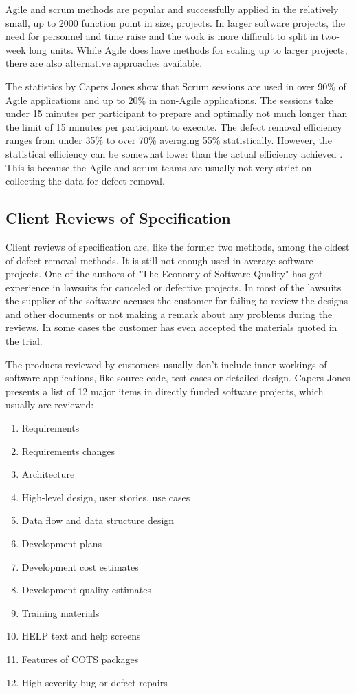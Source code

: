 Agile and scrum methods are popular and successfully applied in the relatively small, up to 2000 function point in size, projects. In larger software projects, the need for personnel and time raise and the work is more difficult to split in two-week long units. While Agile does have methods for scaling up to larger projects, there are also alternative approaches available.

The statistics by Capers Jones show that Scrum sessions are used in over 90\% of Agile applications and up to 20\% in non-Agile applications. The sessions take under 15 minutes per participant to prepare and optimally not much longer than the limit of 15 minutes per participant to execute. The defect removal efficiency ranges from under 35\% to over 70\% averaging 55\% statistically. However, the statistical efficiency can be somewhat lower than the actual efficiency achieved . This is because the Agile and scrum teams are usually not very strict on collecting the data for defect removal.

\subsection{Client Reviews of Specification} 
Client reviews of specification are, like the former two methods, among the oldest of defect removal methods. It is still not enough used in average software projects. One of the authors of "The Economy of Software Quality" has got experience in lawsuits for canceled or defective projects. In most of the lawsuits the supplier of the software accuses the customer for failing to review the designs and other documents or not making a remark about any problems during the reviews. In some cases the customer has even accepted the materials quoted in the trial.

The products reviewed by customers usually don't include inner workings of software applications, like source code, test cases or detailed design. Capers Jones presents a list of 12 major items in directly funded software projects, which usually are reviewed:

\begin{enumerate}
	\item Requirements
	\item Requirements changes
	\item Architecture
	\item High-level design, user stories, use cases
	\item Data flow and data structure design
	\item Development plans
	\item Development cost estimates
	\item Development quality estimates
	\item Training materials
	\item HELP text and help screens
	\item Features of COTS packages
	\item High-severity bug or defect repairs
\end{enumerate}

